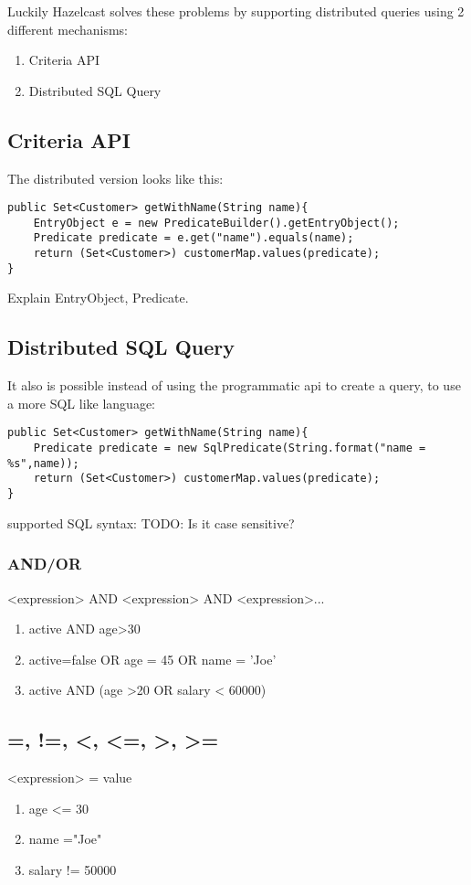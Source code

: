Luckily Hazelcast solves these problems by supporting distributed queries using 2 different mechanisms:
\begin{enumerate}
\item Criteria API
\item Distributed SQL Query
\end{enumerate}

\subsection{Criteria API}

The distributed version looks like this:

\begin{verbatim}
public Set<Customer> getWithName(String name){
    EntryObject e = new PredicateBuilder().getEntryObject();
    Predicate predicate = e.get("name").equals(name);
    return (Set<Customer>) customerMap.values(predicate);
}
\end{verbatim}

Explain EntryObject, Predicate.

\subsection{Distributed SQL Query}
It also is possible instead of using the programmatic api to create a query, to use a more SQL like language:

\begin{verbatim}
public Set<Customer> getWithName(String name){
    Predicate predicate = new SqlPredicate(String.format("name = %s",name));
    return (Set<Customer>) customerMap.values(predicate);
}
\end{verbatim}

supported SQL syntax:
TODO: Is it case sensitive?

\subsubsection{AND/OR}
<expression> AND <expression> AND <expression>...
\begin{enumerate}
\item active AND age>30
\item active=false OR age = 45 OR name = 'Joe'
\item active AND (age >20 OR salary < 60000)
\end{enumerate}

\subsection{=, !=, <, <=, >, >=}
<expression> = value
\begin{enumerate}
\item age <= 30
\item name ="Joe"
\item salary != 50000
\end{enumerate}

